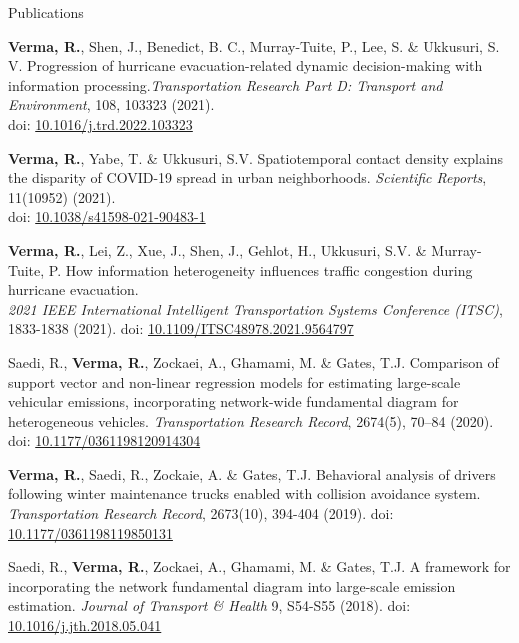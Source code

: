 \documentclass{CV} %
\begin{document}
\begin{rSection}{Publications}
\begin{etaremune}
        \item \textbf{Verma, R.}, Shen, J., Benedict, B. C., Murray-Tuite, P., Lee, S. \& Ukkusuri, S. V. Progression of hurricane evacuation-related dynamic decision-making with information processing.\textit{Transportation Research Part D: Transport and Environment}, 108, 103323 (2021).\\doi: \href{https://doi.org/10.1016/j.trd.2022.103323}{10.1016/j.trd.2022.103323}
        
        \item \textbf{Verma, R.}, Yabe, T. \& Ukkusuri, S.V. Spatiotemporal contact density explains the disparity of COVID-19 spread in urban neighborhoods. \textit{Scientific Reports}, 11(10952) (2021).
        \\ doi: \href{https://www.nature.com/articles/s41598-021-90483-1}{10.1038/s41598-021-90483-1}
        
        
        \item \textbf{Verma, R.}, Lei, Z., Xue, J., Shen, J., Gehlot, H., Ukkusuri, S.V. \& Murray-Tuite, P. How information heterogeneity influences traffic congestion during hurricane evacuation.
        \\ \textit{2021 IEEE International Intelligent Transportation Systems Conference (ITSC)}, 1833-1838 (2021). doi: \href{https://ieeexplore.ieee.org/document/9564797}{10.1109/ITSC48978.2021.9564797}

        \item Saedi, R., \textbf{Verma, R.}, Zockaei, A., Ghamami, M. \& Gates, T.J. Comparison of support vector and non-linear regression models for estimating large-scale vehicular emissions, incorporating network-wide fundamental diagram for heterogeneous vehicles. \textit{Transportation Research Record}, 2674(5), 70–84 (2020). doi: \href{https://journals.sagepub.com/doi/abs/10.1177/0361198120914304}{10.1177/0361198120914304}
        
        \item \textbf{Verma, R.}, Saedi, R., Zockaie, A. \& Gates, T.J. Behavioral analysis of drivers following winter maintenance trucks enabled with collision avoidance system. \textit{Transportation Research Record}, 2673(10), 394-404 (2019). doi: \href{https://journals.sagepub.com/doi/abs/10.1177/0361198119850131}{10.1177/0361198119850131}
        
        \item Saedi, R., \textbf{Verma, R.}, Zockaei, A., Ghamami, M. \& Gates, T.J. A framework for incorporating the network fundamental diagram into large-scale emission estimation. \textit{Journal of Transport \& Health} 9, S54-S55 (2018). doi: \href{https://www.sciencedirect.com/science/article/abs/pii/S2214140518302263}{10.1016/j.jth.2018.05.041}
    \end{etaremune}
    

\end{rSection}
\end{document}
